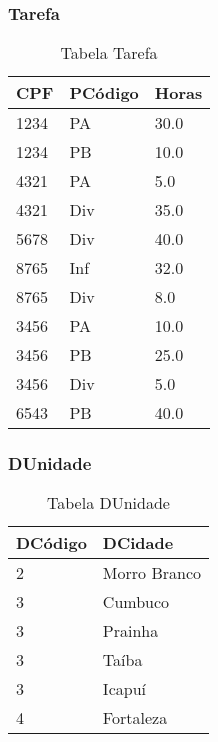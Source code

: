 \documentclass[a4paper,12pt]{article}
\begin{document}
\subsubsection*{Tarefa}
\begin{table}[H]
\centering
\caption{Tabela Tarefa}
\begin{tabular}{|l|l|l|}
\hline
\textbf{CPF} & \textbf{PCódigo} & \textbf{Horas} \\ \hline
1234         & PA               & 30.0            \\ \hline
1234         & PB               & 10.0            \\ \hline
4321         & PA               & 5.0             \\ \hline
4321         & Div              & 35.0            \\ \hline
5678         & Div              & 40.0            \\ \hline
8765         & Inf              & 32.0            \\ \hline
8765         & Div              & 8.0             \\ \hline
3456         & PA               & 10.0            \\ \hline
3456         & PB               & 25.0            \\ \hline
3456         & Div              & 5.0             \\ \hline
6543         & PB               & 40.0            \\ \hline
\end{tabular}
\end{table}

\subsubsection*{DUnidade}
\begin{table}[H]
\centering
\caption{Tabela DUnidade}
\begin{tabular}{|l|l|}
\hline
\textbf{DCódigo} & \textbf{DCidade} \\ \hline
2                & Morro Branco     \\ \hline
3                & Cumbuco          \\ \hline
3                & Prainha          \\ \hline
3                & Taíba            \\ \hline
3                & Icapuí           \\ \hline
4                & Fortaleza        \\ \hline
\end{tabular}
\end{table}
\end{document}
